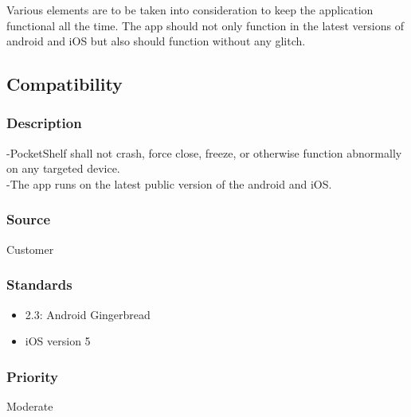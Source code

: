 Various elements are to be taken into consideration to keep the application functional all the time. The app should not only function in the latest versions of android and iOS but also should function without any glitch.

\subsection{Compatibility}
\subsubsection{Description}

-PocketShelf shall not crash, force close, freeze, or otherwise function abnormally on any targeted device.\\
-The app runs on the latest public version of the android and iOS.
\subsubsection{Source}
Customer
\subsubsection{Standards}
\begin{itemize}
\item2.3: Android Gingerbread
\item iOS version 5 
\end{itemize}
\subsubsection{Priority}
Moderate